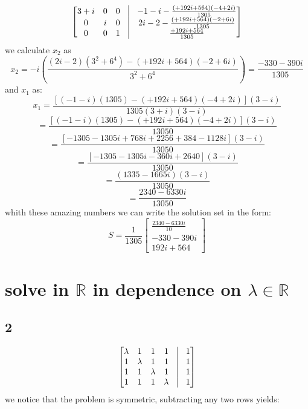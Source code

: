\documentclass[a4paper,10pt]{article}
\begin{document}
\[
 \begin{bmatrix}
 3+i & 0     & 0   & \vline & -1-i- \frac{(+192i+564)(-4+2i)}{1305}\\
 0   & i     & 0   & \vline & 2i-2- \frac{(+192i+564)(-2+6i)}{1305}\\
 0   & 0     & 1   & \vline & \frac{+192i+564}{1305}\\
\end{bmatrix}
\]
we calculate $x_2$ as
\[
x_2= -i\left( \frac{(2i-2)(3^2+6^4)-(+192i+564)(-2+6i)}{3^2+6^4} \right)=\frac{-330-390i}{1305}
\]
and $x_1$ as:
\[
x_1=  \frac{\left[(-1-i)(1305)-(+192i+564)(-4+2i)     \right](3-i)}{1305(3+i)(3-i)}\]\[
=     \frac{\left[(-1-i)(1305)-(+192i+564)(-4+2i)     \right](3-i)}{13050}\]\[
=     \frac{\left[-1305-1305i+768i +2256+384 -1128i   \right](3-i)}{13050}\]\[
=     \frac{\left[-1305-1305i-360i +2640              \right](3-i)}{13050}\]\[
=     \frac{(1335-1665i)(3-i)}{13050}\]\[
=     \frac{2340-6330i}{13050}
\]
whith these amazing numbers we can write the solution set in the form:
\[
S=\frac{1}{1305}
\begin{bmatrix}
 \frac{2340-6330i}{10} \\ -330-390i \\ 192i+564
\end{bmatrix}
\]
\section{solve in $\mathbb{R} $ in dependence on $\lambda \in \mathbb{R} $}
\subsection*{2}
\[
\begin{bmatrix}
 \lambda & 1 & 1 & 1 & \vline & 1 \\
 1 & \lambda & 1 & 1 & \vline & 1 \\
 1 & 1 & \lambda & 1 & \vline & 1 \\
 1 & 1 & 1 & \lambda & \vline & 1 \\ 
\end{bmatrix}
\]
we notice that the problem is symmetric, subtracting any two rows yields:
\end{document}
